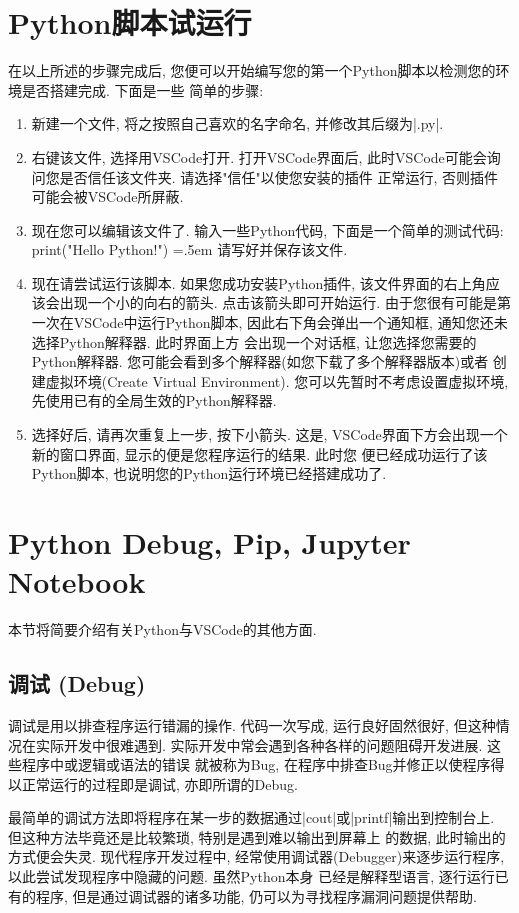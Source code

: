 \documentclass[11pt]{article}
\newenvironment{lcverbatim}
 {\SaveVerbatim{cverb}}
 {\endSaveVerbatim
  \flushleft\fboxrule=0pt\fboxsep=.5em
  \colorbox{cverbbg}{%
    \makebox[\dimexpr\linewidth-2\fboxsep][l]{\BUseVerbatim{cverb}}%
  }
  \endflushleft
}
\begin{document}
\section{Python脚本试运行}\label{Run}
在以上所述的步骤完成后, 您便可以开始编写您的第一个Python脚本以检测您的环境是否搭建完成. 下面是一些
简单的步骤:
\begin{enumerate}
    \item 新建一个文件, 将之按照自己喜欢的名字命名, 并修改其后缀为\cverb|.py|.
    \item 右键该文件, 选择用VSCode打开. 打开VSCode界面后, 此时VSCode可能会询问您是否信任该文件夹. 请选择"信任"以使您安装的插件
    正常运行, 否则插件可能会被VSCode所屏蔽.
    \item 现在您可以编辑该文件了. 输入一些Python代码, 下面是一个简单的测试代码:
    \begin{lcverbatim}
print("Hello Python!")
    \end{lcverbatim}
    请写好并保存该文件.
    \item 现在请尝试运行该脚本. 如果您成功安装Python插件, 该文件界面的右上角应该会出现一个小的向右的箭头. 点击该箭头即可开始运行.
    由于您很有可能是第一次在VSCode中运行Python脚本, 因此右下角会弹出一个通知框, 通知您还未选择Python解释器. 此时界面上方
    会出现一个对话框, 让您选择您需要的Python解释器. 您可能会看到多个解释器(如您下载了多个解释器版本)或者
    {\sffamily{}创建虚拟环境(Create Virtual Environment)}. 您可以先暂时不考虑设置虚拟环境, 先使用已有的全局生效的Python解释器.
    \item 选择好后, 请再次重复上一步, 按下小箭头. 这是, VSCode界面下方会出现一个新的窗口界面, 显示的便是您程序运行的结果. 此时您
    便已经成功运行了该Python脚本, 也说明您的Python运行环境已经搭建成功了.
\end{enumerate}

\section{Python Debug, Pip, Jupyter Notebook}
本节将简要介绍有关Python与VSCode的其他方面.
\subsection{调试 (Debug)}
调试是用以排查程序运行错漏的操作. 代码一次写成, 运行良好固然很好, 但这种情况在实际开发中很难遇到. 实际开发中常会遇到各种各样的问题阻碍开发进展. 
这些程序中或逻辑或语法的错误
就被称为Bug, 在程序中排查Bug并修正以使程序得以正常运行的过程即是调试, 亦即所谓的Debug.

最简单的调试方法即将程序在某一步的数据通过\cverb|cout|或\cverb|printf|输出到控制台上. 但这种方法毕竟还是比较繁琐, 特别是遇到难以输出到屏幕上
的数据, 此时输出的方式便会失灵. 现代程序开发过程中, 经常使用调试器(Debugger)来逐步运行程序, 以此尝试发现程序中隐藏的问题. 虽然Python本身
已经是解释型语言, 逐行运行已有的程序, 但是通过调试器的诸多功能, 仍可以为寻找程序漏洞问题提供帮助.
\end{document}
